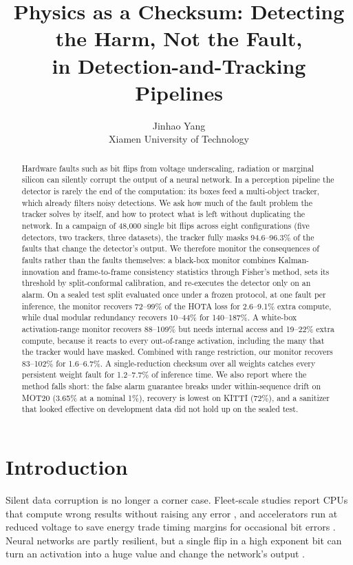 \documentclass[11pt]{article}
\title{Physics as a Checksum: Detecting the Harm, Not the Fault,\\in Detection-and-Tracking Pipelines}
\author{Jinhao Yang\\Xiamen University of Technology}
\date{}
\begin{document}
\maketitle

\begin{abstract}
Hardware faults such as bit flips from voltage underscaling, radiation or marginal silicon can silently corrupt the output of a neural network. In a perception pipeline the detector is rarely the end of the computation: its boxes feed a multi-object tracker, which already filters noisy detections. We ask how much of the fault problem the tracker solves by itself, and how to protect what is left without duplicating the network. In a campaign of 48{,}000 single bit flips across eight configurations (five detectors, two trackers, three datasets), the tracker fully masks 94.6--96.3\% of the faults that change the detector's output. We therefore monitor the consequences of faults rather than the faults themselves: a black-box monitor combines Kalman-innovation and frame-to-frame consistency statistics through Fisher's method, sets its threshold by split-conformal calibration, and re-executes the detector only on an alarm. On a sealed test split evaluated once under a frozen protocol, at one fault per inference, the monitor recovers 72--99\% of the HOTA loss for 2.6--9.1\% extra compute, while dual modular redundancy recovers 10--44\% for 140--187\%. A white-box activation-range monitor recovers 88--109\% but needs internal access and 19--22\% extra compute, because it reacts to every out-of-range activation, including the many that the tracker would have masked. Combined with range restriction, our monitor recovers 83--102\% for 1.6--6.7\%. A single-reduction checksum over all weights catches every persistent weight fault for 1.2--7.7\% of inference time. We also report where the method falls short: the false alarm guarantee breaks under within-sequence drift on MOT20 (3.65\% at a nominal 1\%), recovery is lowest on KITTI (72\%), and a sanitizer that looked effective on development data did not hold up on the sealed test.
\end{abstract}

\section{Introduction}

Silent data corruption is no longer a corner case. Fleet-scale studies report CPUs that compute wrong results without raising any error \citep{hochschild2021cores,dixit2021sdc}, and accelerators run at reduced voltage to save energy trade timing margins for occasional bit errors \citep{zhang2018thundervolt}. Neural networks are partly resilient, but a single flip in a high exponent bit can turn an activation into a huge value and change the network's output \citep{li2017understanding,reagen2018ares}.
\end{document}

